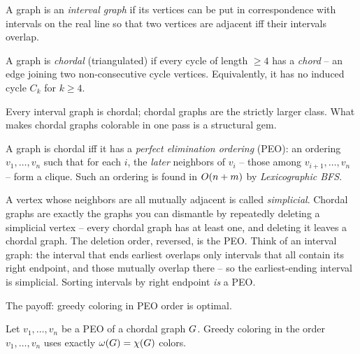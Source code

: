 \begin{definition}
\label{ch28:def-interval}
A graph is an \emph{interval graph} if its vertices can be put in correspondence
with intervals on the real line so that two vertices are adjacent iff their
intervals overlap.
\end{definition}

\begin{definition}
\label{ch28:def-chordal}
A graph is \emph{chordal} (triangulated) if every cycle of length $\ge 4$ has a
\emph{chord} -- an edge joining two non-consecutive cycle vertices. Equivalently,
it has no induced cycle $C_k$ for $k\ge 4$.
\end{definition}

Every interval graph is chordal; chordal graphs are the strictly larger class. What
makes chordal graphs colorable in one pass is a structural gem.

\begin{theorem}
\label{ch28:thm-peo}
A graph is chordal iff it has a \emph{perfect elimination ordering} (PEO): an
ordering $v_1,\dots,v_n$ such that for each $i$, the \emph{later} neighbors of
$v_i$ -- those among $v_{i+1},\dots,v_n$ -- form a clique. Such an ordering is found
in $O(n+m)$ by \emph{Lexicographic BFS}.
\end{theorem}

\begin{intuitionbox}
A vertex whose neighbors are all mutually adjacent is called \emph{simplicial}.
Chordal graphs are exactly the graphs you can dismantle by repeatedly deleting a
simplicial vertex -- every chordal graph has at least one, and deleting it leaves a
chordal graph. The deletion order, reversed, is the PEO. Think of an interval graph:
the interval that ends earliest overlaps only intervals that all contain its right
endpoint, and those mutually overlap there -- so the earliest-ending interval is
simplicial. Sorting intervals by right endpoint \emph{is} a PEO.
\end{intuitionbox}

The payoff: greedy coloring in PEO order is optimal.

\begin{theorem}
\label{ch28:thm-chordal-color}
Let $v_1,\dots,v_n$ be a PEO of a chordal graph $G$. Greedy coloring in the
order $v_1,\dots,v_n$ uses exactly $\omega(G)=\chi(G)$ colors.
\end{theorem}

